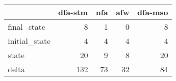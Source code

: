 \begin{tabular}{lrrrr}
\toprule
{} &  dfa-stm &  nfa &  afw &  dfa-mso \\
\midrule
final\_state   &        8 &    1 &    0 &        8 \\
initial\_state &        4 &    4 &    4 &        4 \\
state         &       20 &    9 &    8 &       20 \\
delta         &      132 &   73 &   32 &       84 \\
\bottomrule
\end{tabular}
